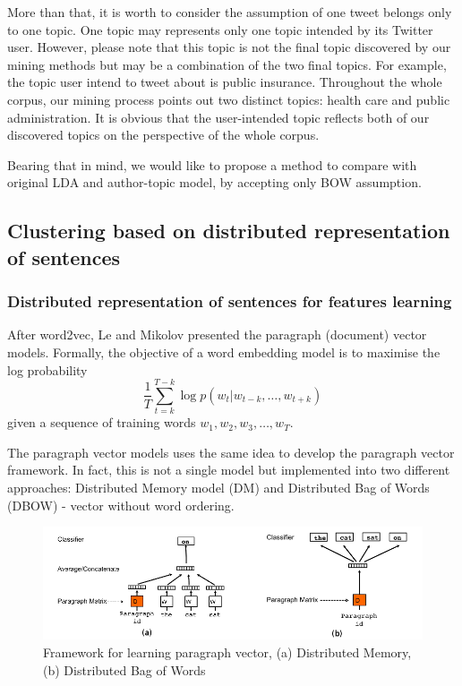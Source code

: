 \documentclass[11pt]{article}
\begin{document}
More than that, it is worth to consider the assumption of one tweet belongs only to one topic. One topic may represents only one topic intended by its Twitter user. However, please note that this topic is not the final topic discovered by our mining methods but may be a combination of the two final topics. For example, the topic user intend to tweet about is public insurance. Throughout the whole corpus, our mining process points out two distinct topics: health care and public administration. It is obvious that the user-intended topic reflects both of our discovered topics on the perspective of the whole corpus.

Bearing that in mind, we would like to propose a method to compare with original LDA and author-topic model, by accepting only BOW assumption.

\subsection{Clustering based on distributed representation of sentences} \label{doc2vec}

\subsubsection{Distributed representation of sentences for features learning}
After word2vec\cite{mikolov2013distributed}, Le and Mikolov presented the paragraph (document) vector models. Formally, the objective of a word embedding model  is to maximise the log probability
\[\frac{1}{T}\sum_{t=k}^{T-k}\log p(w_t|w_{t-k},\dots,w_{t+k}) \]
given a sequence of training words $w_1,w_2,w_3,\dots,w_T$.


The paragraph vector models uses the same idea to develop the paragraph vector framework. In fact, this is not a single model but implemented into two different approaches: Distributed Memory model (DM) and Distributed Bag of Words (DBOW) - vector without word ordering.

\begin{figure}[ht]
	\centering
	\includegraphics[width=\textwidth]{doc2vec}
	\caption{Framework for learning paragraph vector, (a) Distributed Memory, (b) Distributed Bag of Words}
	\label{fig:doc2vec}
\end{figure}
\end{document}
